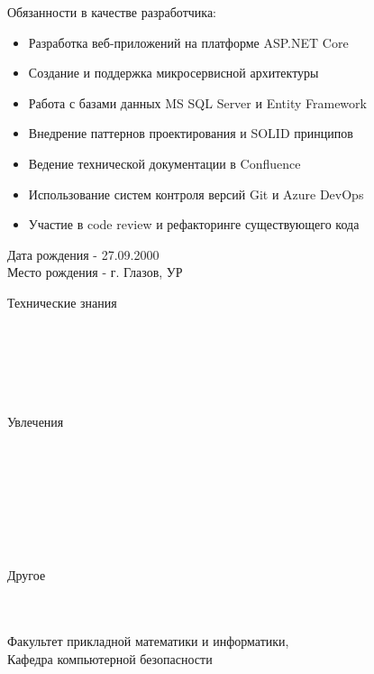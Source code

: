 \documentclass[10pt,a4paper,ragged2e,withhyper]{altacv}
\begin{document}
\begin{paracol}{2}
\textcolor{PastelRed}{Обязанности в качестве разработчика:}
\begin{itemize}
    \item Разработка веб-приложений на платформе ASP.NET Core
    \item Создание и поддержка микросервисной архитектуры
    \item Работа с базами данных MS SQL Server и Entity Framework
    \item Внедрение паттернов проектирования и SOLID принципов
    \item Ведение технической документации в Confluence
    \item Использование систем контроля версий Git и Azure DevOps
    \item Участие в code review и рефакторинге существующего кода
\end{itemize}

\medskip
\switchcolumn
{}
Дата рождения - 27.09.2000\\
Место рождения - г. Глазов, УР


Технические знания \linebreak\\
\\
\\
\\
\\
\\

\divider\smallskip

Увлечения \linebreak\\
 \\
 \\
 \\
 \\
 \\
 \\\

\divider\smallskip

Другое \linebreak\\
\\
\\



\divider


\medskip


Факультет прикладной математики и информатики,\\
Кафедра компьютерной безопасности
\end{paracol}
\end{document}
